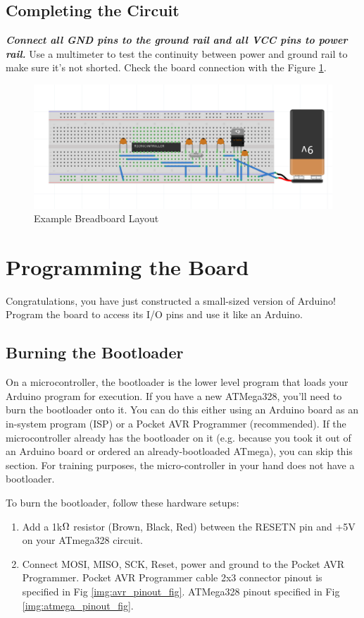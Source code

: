 \documentclass{article}
\begin{document}
\subsection{Completing the Circuit}
\textbf{\emph{Connect all GND pins to the ground rail and all VCC pins to power rail.}} Use a multimeter to test the continuity between power and ground rail to make sure it's not shorted. Check the board connection with the Figure \ref{img:egBBL}.

\begin{figure}[h]
    \center
    \includegraphics[width=\textwidth,keepaspectratio]{egBBL}
    \caption{Example Breadboard Layout}
    \label{img:egBBL}
\end{figure}

\section{Programming the Board}
Congratulations, you have just constructed a small-sized version of Arduino! Program the board to access its I/O pins and use it like an Arduino. 
\subsection{Burning the Bootloader}
On a microcontroller, the bootloader is the lower level program that loads your Arduino program for execution. If you have a new ATMega328, you'll need to burn the bootloader onto it. You can do this either using an Arduino board as an in-system program (ISP) or a Pocket AVR Programmer (recommended). If the microcontroller already has the bootloader on it (e.g. because you took it out of an Arduino board or ordered an already-bootloaded ATmega), you can skip this section. For training purposes, the micro-controller in your hand does not have a bootloader. \par
To burn the bootloader, follow these hardware setups: \par
\begin{enumerate}
    \item Add a 1k$\ohm$ resistor (Brown, Black, Red) between the RESETN pin and +5V on your ATmega328 circuit. 
    \item Connect MOSI, MISO, SCK, Reset, power and ground to the Pocket AVR Programmer. Pocket AVR Programmer cable 2x3 connector pinout is specified in Fig \ref{img:avr_pinout_fig}. ATMega328 pinout specified in Fig \ref{img:atmega_pinout_fig}.
\end{enumerate}
\end{document}
